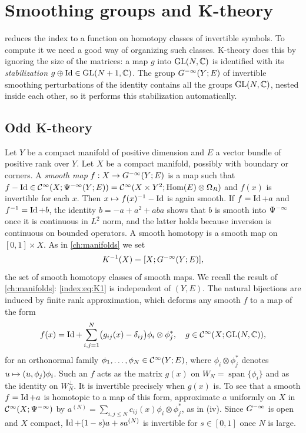 \section{Smoothing groups and K-theory}\label{index:sec:K}

 reduces the index to a function on homotopy classes of
invertible symbols. To compute it we need a good way of organizing such classes.
K-theory does this by ignoring the size of the matrices: a map $g$ into
$\operatorname{GL}(N,\mathbb{C})$ is identified with its \emph{stabilization}
$g\oplus\operatorname{Id}\in\operatorname{GL}(N+1,\mathbb{C})$. The group $G^{-\infty}(Y;E)$ of invertible smoothing
perturbations of the identity contains all the groups $\operatorname{GL}(N,\mathbb{C})$, nested inside
each other, so it performs this stabilization automatically.

\subsection{Odd K-theory}
Let $Y$ be a compact manifold of positive dimension and $E$ a vector bundle of positive rank
over $Y$. Let $X$ be a compact manifold, possibly with boundary or corners. A
\emph{smooth map} $f:X\to G^{-\infty}(Y;E)$ is a map such that
$f-\operatorname{Id}\in\mathcal{C}^\infty(X;\Psi^{-\infty}(Y;E))=\mathcal{C}^\infty(X\times Y^2;\operatorname{Hom}(E)\otimes\Omega_R)$
and $f(x)$ is invertible for each $x$. Then $x\mapsto f(x)^{-1}-\operatorname{Id}$ is again
smooth. If $f=\operatorname{Id}+a$ and $f^{-1}=\operatorname{Id}+b$, the identity $b=-a+a^2+aba$ shows
that $b$ is smooth into $\Psi^{-\infty}$ once it is continuous in $L^2$
norm, and the latter holds because inversion is continuous on bounded
operators. A smooth homotopy is a smooth map on $[0,1]\times X$. As in
\cref{ch:manifolds} we set
\begin{equation}\label{index:eq:K1}
  K^{-1}(X)=[X;G^{-\infty}(Y;E)],
\end{equation}
the set of smooth homotopy classes of smooth maps. We recall the result of
\cref{ch:manifolds}: \eqref{index:eq:K1} is independent of $(Y,E)$. The
natural bijections are induced by finite rank approximation, which deforms
any smooth $f$ to a map of the form
\begin{equation}\label{index:eq:finite-rank}
  f(x)=\operatorname{Id}+\sum_{i,j=1}^N\bigl(g_{ij}(x)-\delta_{ij}\bigr)\phi_i\otimes\phi_j^*,
  \quad g\in\mathcal{C}^\infty(X;\operatorname{GL}(N,\mathbb{C})),
\end{equation}
for an orthonormal family $\phi_1,\dots,\phi_N\in\mathcal{C}^\infty(Y;E)$, where
$\phi_i\otimes\phi_j^*$ denotes $u\mapsto( u, \phi_j)\phi_i$. Such an
$f$ acts as the matrix $g(x)$ on $W_N=\operatorname{span}\{\phi_i\}$ and as
the identity on $W_N^\perp$. It is invertible precisely when $g(x)$ is. To
see that a smooth $f=\operatorname{Id}+a$ is homotopic to a map of this form, approximate
$a$ uniformly on $X$ in $\mathcal{C}^\infty(X;\Psi^{-\infty})$ by
$a^{(N)}=\sum_{i,j\le N}c_{ij}(x)\phi_i\otimes\phi_j^*$, as in (iv). Since
$G^{-\infty}$ is open and $X$ compact, $\operatorname{Id}+(1-s)a+sa^{(N)}$ is invertible for
$s\in[0,1]$ once $N$ is large.

